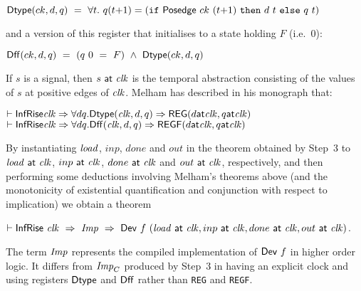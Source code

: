 \vspace*{2mm}

$\mathsf{Dtype}(ck,d,q) ~=~ \forall t.~q(t{+}1) = (\texttt{if}~\mathsf{Posedge}~ck~(t{+}1)~\texttt{then}~d~t~\texttt{else}~q~t)$

\vspace*{2mm}

\noindent and a version of this register that initialises to a state holding $F$ (i.e.~$0$):

\vspace*{2mm}

$\mathsf{Dff}(ck,d,q) ~ = ~ (q~0~ =~F)~\wedge~\mathsf{Dtype}(ck,d,q)$

\vspace*{2mm}

If $s$ is a signal, then $s~\mathsf{at}~\mathit{clk}$ is the temporal
abstraction consisting of the values of $s$ at positive edges of
$\mathit{clk}$. 
Melham has described in his monograph that:




{\baselineskip14pt\begin{alltt}
\( \vdash \DEF{InfRise} \VAR{clk} \Rightarrow {\forall}d q. \DEF{Dtype}(\VAR{clk},d,q) \Rightarrow \DEF{REG}(d \DEF{at} \VAR{clk}, q \DEF{at} \VAR{clk}) \)
\( \vdash \DEF{InfRise} \VAR{clk} \Rightarrow {\forall}d q. \DEF{Dff}(\VAR{clk},d,q) \Rightarrow \DEF{REGF}(d \DEF{at} \VAR{clk}, q \DEF{at} \VAR{clk})  \)
\end{alltt}}



By instantiating $\mathit{load}$, $inp$, $done$ and $out$ in the theorem
obtained by Step~3 to $\mathit{load}~\mathsf{at}~\mathit{clk}$, $inp~\mathsf{at}~\mathit{clk}$,
$done~\mathsf{at}~\mathit{clk}$ and $out~\mathsf{at}~\mathit{clk}$, respectively, and then
performing some deductions involving Melham's theorems above (and the
monotonicity of existential quantification and conjunction with
respect to implication) we obtain a theorem

\vspace*{2mm}

$\vdash \mathsf{InfRise}~\mathit{clk}~\Rightarrow~{\it{Imp}}~\Rightarrow~\mathsf{Dev}~f~(\mathit{load}~\mathsf{at}~\mathit{clk},inp~\mathsf{at}~\mathit{clk},done~\mathsf{at}~\mathit{clk},out~\mathsf{at}~\mathit{clk})$.

\vspace*{2mm}

The term ${\it{Imp}}$ represents the compiled implementation of $\mathsf{Dev}~f$ in higher order logic.
It differs from ${\it{Imp}}_C$ produced by Step~3 in having an explicit clock and using
registers $\mathsf{Dtype}$ and $\mathsf{Dff}$ rather than \texttt{REG} and \texttt{REGF}.

